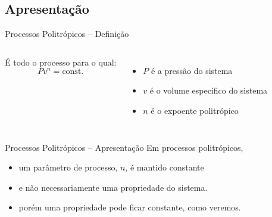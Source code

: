 \subsection{Apresentação}

    \begin{frame}{Processos Politrópicos -- Definição}\vspace*{-2em}
        \begin{columns}
        É todo o processo para o qual:
        $$Pv^n = \mbox{const.}$$
         \\[\bigskipamount]
        \begin{itemize}
            \item<2-> $P$ é a pressão do sistema \\[\bigskipamount]
            \item<3-> $v$ é o volume específico do sistema \\[\bigskipamount]
            \item<4-> $n$ é o \alert{expoente politrópico}
        \end{itemize}
        \end{columns}
    \end{frame}

    \begin{frame}{Processos Politrópicos -- Apresentação}\vspace*{-2em}
        Em processos politrópicos, \\[\medskipamount]
        \begin{itemize}
            \item<1-> um \alert{parâmetro} de processo, \alert{$n$}, é mantido constante
                \\[\medskipamount]
            \item<2-> e não \alert{necessariamente} uma \alert{propriedade} do sistema.
                \\[\medskipamount]
            \item<3-> porém uma propriedade \alert{pode} ficar constante, como veremos.
                \\[\medskipamount]
        \end{itemize}
    \end{frame}

